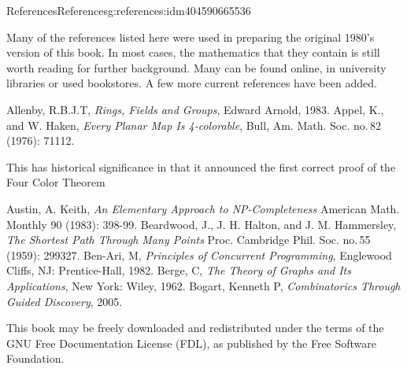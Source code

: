 \documentclass[twoside,10pt,]{book}
\numberwithin{equation}{section}
\begin{document}
%
\begin{references-chapter-numberless}{References}{}{References}{}{}{g:references:idm404590665536}
%
\begin{introduction}{}%
Many of the references listed here were used in preparing the original 1980's version of this book.  In most cases, the mathematics that they contain is still worth reading for further background. Many can be found online, in university libraries or used bookstores.  A few more current references have been added.%
\end{introduction}%
\begin{referencelist}
\label{x:biblio:biblio-allenby-1983}{}\hypertarget{x:biblio:biblio-allenby-1983}{}Allenby, R.B.J.T, \textit{Rings, Fields and Groups}, Edward Arnold, 1983.
\label{x:biblio:biblio-appel-1976}{}\hypertarget{x:biblio:biblio-appel-1976}{}Appel, K., and W. Haken, \textit{Every Planar Map Is 4-colorable},  Bull, Am. Math. Soc. no.\@\,82 (1976): 711\textendash{}12.\par%
This has historical significance in that it announced the first correct proof of the Four Color Theorem%

\label{x:biblio:biblio-austin-1983}{}\hypertarget{x:biblio:biblio-austin-1983}{}Austin, A. Keith, \textit{An Elementary Approach to NP-Completeness} American Math. Monthly 90 (1983): 398-99.
\label{x:biblio:biblio-beardwood-1959}{}\hypertarget{x:biblio:biblio-beardwood-1959}{}Beardwood, J., J. H. Halton, and J. M. Hammersley, \textit{The Shortest Path Through Many Points} Proc. Cambridge Phil. Soc. no.\@\,55 (1959): 299\textendash{}327.
\label{x:biblio:biblio-benari-1982}{}\hypertarget{x:biblio:biblio-benari-1982}{}Ben-Ari, M, \textit{Principles of Concurrent Programming}, Englewood Cliffs, NJ: Prentice-Hall, 1982.
\label{x:biblio:biblio-berge-1962}{}\hypertarget{x:biblio:biblio-berge-1962}{}Berge, C, \textit{The Theory of Graphs and Its Applications}, New York: Wiley, 1962.
\label{x:biblio:biblio-bogart-2005}{}\hypertarget{x:biblio:biblio-bogart-2005}{}Bogart, Kenneth P, \textit{Combinatorics Through Guided Discovery},  2005.\par%
This book may be freely downloaded and redistributed   under the terms of the GNU Free Documentation License (FDL), as published by the Free Software Foundation.%


\end{referencelist}
\end{references-chapter-numberless}
\end{document}
